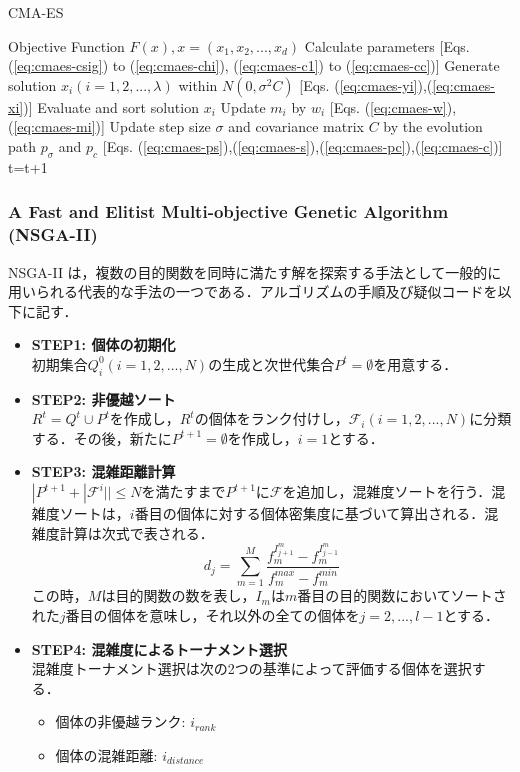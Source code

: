 \documentclass[a4j,11pt]{jarticle}
\begin{document}
\begin{algorithm}[H]
\caption{CMA-ES}
\label{code:cma-es}
\begin{algorithmic}[5]
\REQUIRE Objective Function $F(x), x=(x_1,x_2,...,x_d)$
\STATE Calculate parameters [Eqs. (\ref{eq:cmaes-csig}) to (\ref{eq:cmaes-chi}), (\ref{eq:cmaes-c1}) to (\ref{eq:cmaes-cc})]
\STATE Generate solution $x_i (i=1,2,...,\lambda)$ within $N(0, \sigma^2 C)$ [Eqs. (\ref{eq:cmaes-yi}),(\ref{eq:cmaes-xi})]
\ENDFOR
\STATE Evaluate and sort solution $x_i$
\STATE Update $m_i$ by $w_i$ [Eqs. (\ref{eq:cmaes-w}),(\ref{eq:cmaes-mi})]
\STATE Update step size $\sigma$ and covariance matrix $C$ by the evolution path $p_{\sigma}$ and $p_c$ [Eqs. (\ref{eq:cmaes-ps}),(\ref{eq:cmaes-s}),(\ref{eq:cmaes-pc}),(\ref{eq:cmaes-c})]
\ENDFOR
\STATE t=t+1
\ENDWHILE
\end{algorithmic}
\end{algorithm}

\subsubsection{A Fast and Elitist Multi-objective Genetic Algorithm (NSGA-II)}
\label{sss:nsga}
NSGA-II \cite{NSGAII} は，複数の目的関数を同時に満たす解を探索する手法として一般的に用いられる代表的な手法の一つである．アルゴリズムの手順及び疑似コードを以下に記す．

\begin{itemize}
\item {\bf STEP1: 個体の初期化} \\
初期集合$Q_i^0 (i=1,2,...,N)$の生成と次世代集合$P^t=\emptyset$を用意する．
\item {\bf STEP2: 非優越ソート}\\
$R^t=Q^t \cup P^t$を作成し，$R^t$の個体をランク付けし，$\mathcal{F}_i (i=1,2,...,N)$に分類する．その後，新たに$P^{t+1}=\emptyset$を作成し，$i=1$とする．
\item {\bf STEP3: 混雑距離計算}\\
$|P^{t+1}+|\mathcal{F}^i||\leq N$を満たすまで$P^{t+1}$に$\mathcal{F}$を追加し，混雑度ソートを行う．混雑度ソートは，$i$番目の個体に対する個体密集度に基づいて算出される．混雑度計算は次式で表される．
\begin{equation}
\label{eq:nsga-crowd}
d_j = \sum_{m=1}^M \frac{f_m^{I^{m}_{j+1}}-f_m^{I^{m}_{j-1}}}{f_m^{max}-f_m^{min}}
\end{equation}
この時，$M$は目的関数の数を表し，$I_m$は$m$番目の目的関数においてソートされた$j$番目の個体を意味し，それ以外の全ての個体を$j=2,...,l-1$とする．
\item {\bf STEP4: 混雑度によるトーナメント選択}\\
混雑度トーナメント選択は次の2つの基準によって評価する個体を選択する．
\begin{itemize}
  \item 個体の非優越ランク: $i_{rank}$
  \item 個体の混雑距離: $i_{distance}$
\end{itemize}
\end{itemize}
\end{document}
